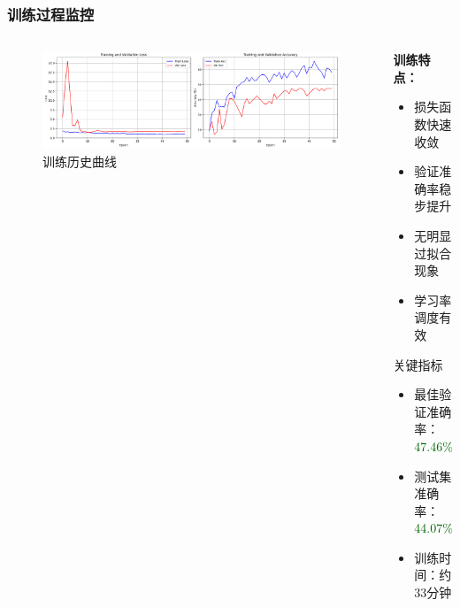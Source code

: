 \documentclass[12pt]{beamer}
\begin{document}
\begin{frame}
\frametitle{训练过程监控}
\begin{columns}
\begin{column}{0.5\textwidth}
\begin{figure}
\centering
\includegraphics[width=\textwidth]{training_history.png}
\caption{训练历史曲线}
\end{figure}
\end{column}

\begin{column}{0.5\textwidth}
\textbf{训练特点：}
\begin{itemize}
    \item 损失函数快速收敛
    \item 验证准确率稳步提升
    \item 无明显过拟合现象
    \item 学习率调度有效
\end{itemize}

\vspace{0.3cm}
\begin{block}{关键指标}
\begin{itemize}
    \item 最佳验证准确率：\textcolor{darkgreen}{47.46\%}
    \item 测试集准确率：\textcolor{darkgreen}{44.07\%}
    \item 训练时间：约33分钟
\end{itemize}
\end{block}
\end{column}
\end{columns}
\end{frame}
\end{document}

